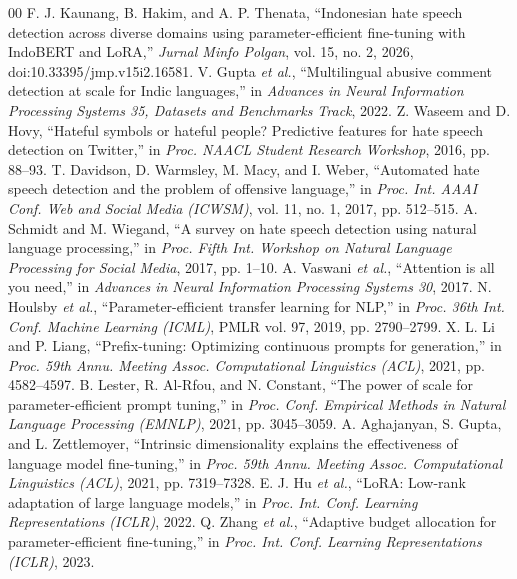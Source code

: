 \documentclass[conference]{IEEEtran}
\begin{document}
\begin{thebibliography}{00}
 F. J. Kaunang, B. Hakim, and A. P. Thenata, ``Indonesian hate speech detection across diverse domains using parameter-efficient fine-tuning with IndoBERT and LoRA,'' \textit{Jurnal Minfo Polgan}, vol. 15, no. 2, 2026, doi:10.33395/jmp.v15i2.16581.
 V. Gupta \textit{et al.}, ``Multilingual abusive comment detection at scale for Indic languages,'' in \textit{Advances in Neural Information Processing Systems 35, Datasets and Benchmarks Track}, 2022.
 Z. Waseem and D. Hovy, ``Hateful symbols or hateful people? Predictive features for hate speech detection on Twitter,'' in \textit{Proc. NAACL Student Research Workshop}, 2016, pp. 88--93.
 T. Davidson, D. Warmsley, M. Macy, and I. Weber, ``Automated hate speech detection and the problem of offensive language,'' in \textit{Proc. Int. AAAI Conf. Web and Social Media (ICWSM)}, vol. 11, no. 1, 2017, pp. 512--515.
 A. Schmidt and M. Wiegand, ``A survey on hate speech detection using natural language processing,'' in \textit{Proc. Fifth Int. Workshop on Natural Language Processing for Social Media}, 2017, pp. 1--10.
 A. Vaswani \textit{et al.}, ``Attention is all you need,'' in \textit{Advances in Neural Information Processing Systems 30}, 2017.
 N. Houlsby \textit{et al.}, ``Parameter-efficient transfer learning for NLP,'' in \textit{Proc. 36th Int. Conf. Machine Learning (ICML)}, PMLR vol. 97, 2019, pp. 2790--2799.
 X. L. Li and P. Liang, ``Prefix-tuning: Optimizing continuous prompts for generation,'' in \textit{Proc. 59th Annu. Meeting Assoc. Computational Linguistics (ACL)}, 2021, pp. 4582--4597.
 B. Lester, R. Al-Rfou, and N. Constant, ``The power of scale for parameter-efficient prompt tuning,'' in \textit{Proc. Conf. Empirical Methods in Natural Language Processing (EMNLP)}, 2021, pp. 3045--3059.
 A. Aghajanyan, S. Gupta, and L. Zettlemoyer, ``Intrinsic dimensionality explains the effectiveness of language model fine-tuning,'' in \textit{Proc. 59th Annu. Meeting Assoc. Computational Linguistics (ACL)}, 2021, pp. 7319--7328.
 E. J. Hu \textit{et al.}, ``LoRA: Low-rank adaptation of large language models,'' in \textit{Proc. Int. Conf. Learning Representations (ICLR)}, 2022.
 Q. Zhang \textit{et al.}, ``Adaptive budget allocation for parameter-efficient fine-tuning,'' in \textit{Proc. Int. Conf. Learning Representations (ICLR)}, 2023.

\end{thebibliography}
\end{document}
